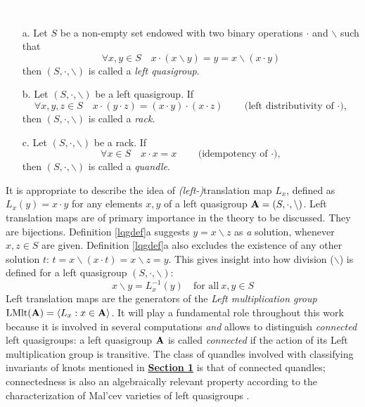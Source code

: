 \documentclass{mcom-l}
\begin{document}
\begin{definition}\textcolor{white}{line}

\begin{enumerate}\label{lqgdef}
    \item[a.] Let $S$ be a non-empty set endowed with two binary operations $\cdot$ and $\backslash$ such that \[\forall x,y \in S\quad x \cdot (x \backslash y ) = y = x \backslash (x \cdot y)\]then $(S, \cdot, \backslash)$ is called a \emph{left quasigroup}.  
\item[b.] Let $( S, \cdot, \backslash )$ be a left quasigroup. 
If 
\[\forall x,y,z \in S \quad x \cdot (y \cdot z) = (x \cdot y) \cdot (x \cdot z) \hspace{2em}\text{(left distributivity of $\cdot$),}\]
then $( S, \cdot, \backslash )$ is called a \emph{rack}.
\item[c.] Let $( S, \cdot, \backslash )$ be a rack.
If 
\[\forall x \in S \quad x \cdot x = x \hspace{2em}\text{(idempotency of $\cdot$),}\]
then $( S, \cdot, \backslash )$ is called a \emph{quandle}.
\end{enumerate}
\end{definition}
\noindent It is appropriate to describe the idea of \newline \emph{(left-)}translation map $L_x$, defined as $L_x(y) = x \cdot y$ for any elements $x,y$ of a left quasigroup $\mathbf{A} = (S, \cdot, \backslash)$. Left translation maps are of primary importance in the theory to be discussed. They are bijections. Definition \ref{lqgdef}a suggests $y=x\backslash z$ as \emph{a} solution, whenever $x,z\in S$ are given. Definition \ref{lqgdef}a also excludes the existence of any other solution $t$: $t = x \backslash (x \cdot t) = x \backslash z = y$.
\noindent This gives insight into how division ($\backslash$) is defined for a left quasigroup $(S, \cdot, \backslash)$: 
\[x\backslash y=L_x^{-1}(y)\quad\text{for all}~x,y \in S\]
\noindent Left translation maps are the generators of the \emph{Left multiplication group} \newline \label{leftmultiplicationgroup}$\operatorname{LMlt}(\mathbf{A}) = \langle L_x : x \in \mathbf{A} \rangle$.  It will play a fundamental role throughout this work because it is involved in several computations \emph{and} allows to distinguish \emph{connected} left quasigroups: a left quasigroup $\mathbf{A}$ is called \emph{connected} if the action of its Left multiplication group is transitive.
The class of quandles involved with classifying invariants of knots mentioned in \hyperref[intro1Connected]{\textbf{Section 1}} is that of connected quandles;  connectedness is also an algebraically relevant property according to the characterization of Mal’cev varieties of left quasigroups \cite{bonatto2021malcev}.
\end{document}
